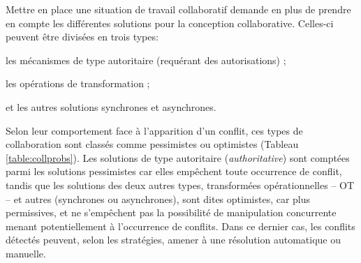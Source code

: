 Mettre en place une situation de travail collaboratif demande en plus de prendre en compte les différentes solutions pour la conception collaborative. Celles-ci peuvent être divisées en 
trois types: 
\begin{enumerate*}[label=(\roman*)]
	\item les mécanismes de type autoritaire (requérant des autorisations) ;
	\item les opérations de transformation ;
	\item et les autres solutions synchrones et asynchrones.
\end{enumerate*}
Selon leur comportement face à l'apparition d'un conflit, ces types de 
collaboration sont classés comme pessimistes ou optimistes (Tableau 
\ref{table:collprobs}). Les solutions de type autoritaire (\og \textit{authoritative}\fg{}) 
sont comptées parmi les solutions pessimistes car elles empêchent toute 
occurrence de conflit, tandis que les solutions des deux autres types,
transformées opérationnelles -- \gls{OT} -- et autres (synchrones ou asynchrones), 
sont dites optimistes, car plus permissives, et ne s'empêchent pas la possibilité de 
manipulation concurrente menant potentiellement à l'occurrence de conflits. 
Dans ce dernier cas, les conflits détectés peuvent, selon les stratégies, amener à 
une résolution automatique ou manuelle.

